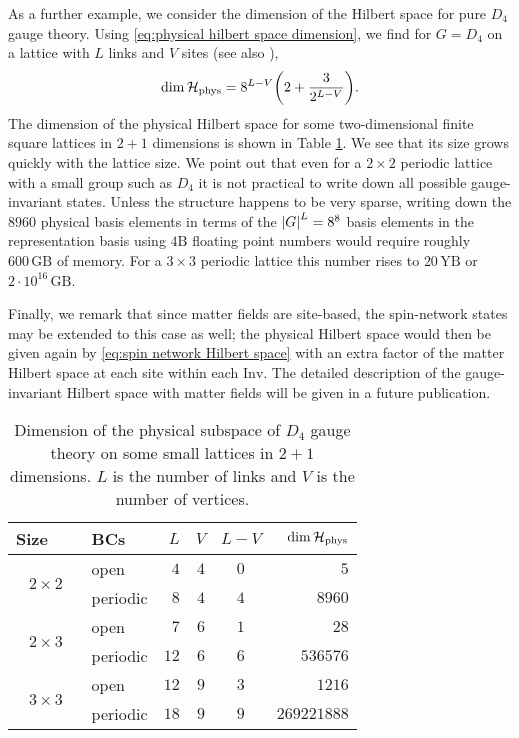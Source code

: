 \medskip

As a further example, we consider the dimension of the Hilbert space for pure $D_4$ gauge theory.
Using \eqref{eq:physical hilbert space dimension}, we find for $G=D_4$ on a lattice with $L$ links and $V$ sites (see also \cite{marchesethesis}),
\begin{equation}
    \dim{\HilbertPhys} = 8^{L-V}\pqty{2+\frac{3}{2^{L-V}}}.
\end{equation}
The dimension of the physical Hilbert space for some two-dimensional finite square lattices in $2+1$ dimensions is shown in Table \ref{tab:numstates}. We see that its size grows quickly with the lattice size. We point out that even for a $2 \times 2$ periodic lattice with a small group such as $D_4$ it is not practical to write down all possible gauge-invariant states. Unless the structure happens to be very sparse, writing down the $8960$ physical basis elements in terms of the $\abs{G}^L = 8^8$ basis elements in the representation basis using $4 \mathrm{B}$ floating point numbers would require roughly $600 \,\mathrm{GB}$ of memory. For a  $3 \times 3$ periodic lattice this number rises to $20\, \mathrm{YB}$ or $2 \cdot 10^{16}\, \mathrm{GB}$.


Finally, we remark that since matter fields are site-based, the spin-network states may be extended to this case as well; the physical Hilbert space would then be given again by \eqref{eq:spin network Hilbert space} with an extra factor of the matter Hilbert space at each site within each $\mathrm{Inv}$. The detailed description of the gauge-invariant Hilbert space with matter fields will be given in a future publication.


\begin{table}[t]
    \centering
    \begin{tabular}{clrrcr}
        \toprule
        Size~~~ & BCs & $L$ & $V$ & $L-V$ &$\dim{\mathcal{H}_{\text{phys}}}$\\
        \midrule
        \multirow{2}{3em}{$2 \times 2$}
            & open & $4$ & $4$ & $0$ & $5$\\
            & periodic & $8$ & $4$ & $4$ & $8960$ \\[5pt]
        \multirow{2}{3em}{$2 \times 3$}
            & open & $7$ & $6$ & $1$ & $28$ \\
            & periodic & $12$ & $6$ & $6$ & $536576$ \\[5pt]
        \multirow{2}{3em}{$3 \times 3$}
            & open & $12$ & $9$ & $3$ & $1216$ \\
            & periodic & $18$ & $9$ & $9$ & $269221888$ \\
        \bottomrule
    \end{tabular}
    \caption{Dimension of the physical subspace of $D_4$ gauge theory on some small lattices in $2+1$ dimensions. $L$ is the number of links and $V$ is the number of vertices.}
    \label{tab:numstates}
\end{table}



